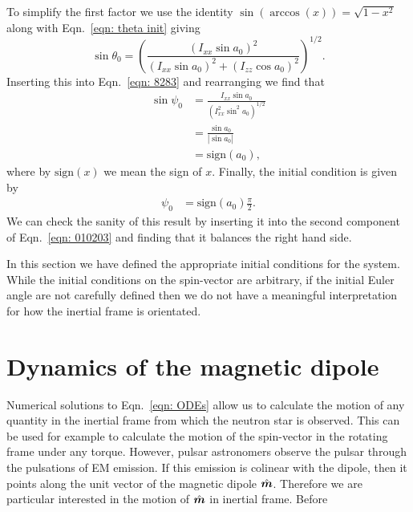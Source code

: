 \documentclass[../full_thesis/full_thesis.tex]{subfiles}
\begin{document}
To simplify the first factor we use the identity $\sin(\arccos(x)) = \sqrt{1 - x^{2}}$
along with Eqn.~\eqref{eqn:  theta init} giving
\begin{equation}
\sin\theta_{0} = \left(\frac{(I_{xx}\sin a_{0})^{2}}
                  {(I_{xx}\sin a_{0})^{2} + (I_{zz}\cos a_{0})^{2}} \right)^{1/2}.
\end{equation}
Inserting this into Eqn.~\eqref{eqn: 8283} and rearranging we find that
\begin{align}
\sin \psi_0 & = \frac{I_{xx} \sin a_{0}}{\left(I_{xx}^{2} \sin^{2} a_{0}\right)^{1/2}} \\
 & = \frac{\sin a_{0} }{|\sin a_{0}|} \\
& = \mathrm{sign}(a_{0}),
\end{align}
where by $\mathrm{sign}(x)$ we mean the sign of $x$. Finally, the initial
condition is given by
\begin{align}
\psi_{0} & =\mathrm{sign}(a_{0}) \frac{\pi}{2}.
\label{eqn: psi  init}
\end{align}
We can check the sanity of this result by inserting it into the second component of
Eqn.~\eqref{eqn: 010203} and finding that it balances the right hand side.

In this section we have defined the appropriate initial conditions for the system.
While the initial conditions on the spin-vector are arbitrary, if the initial
Euler angle are not carefully defined then we do not have a meaningful interpretation
for how the inertial frame is orientated.

\section{Dynamics of the magnetic dipole}

Numerical solutions to Eqn.~\eqref{eqn: ODEs} allow us to calculate the motion
of any quantity in the inertial frame from which the neutron star is observed.
This can be used for example to calculate the motion of the spin-vector in the
rotating frame under any torque. However, pulsar astronomers observe the pulsar
through the pulsations of EM emission. If this emission is colinear with the
dipole, then it points along the unit vector of the magnetic dipole $\hat{\boldsymbol{m}}$. Therefore
we are particular interested in the motion of $\hat{\boldsymbol{m}}$ in inertial frame. Before
\end{document}
